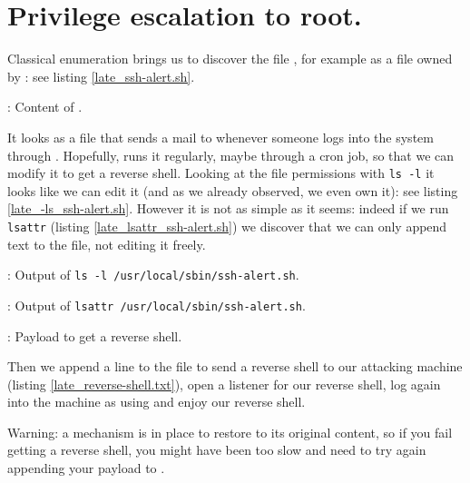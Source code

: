 \section{Privilege escalation to root.}
\par Classical enumeration brings us to discover the file , for example as a file owned by : see listing \ref{late_ssh-alert.sh}.
\begin{listing}
	\caption{: Content of .}
	\label{late_ssh-alert.sh}
\end{listing}
\par It looks as a file that sends a mail to  whenever someone logs into the system through . Hopefully,  runs it regularly, maybe through a cron job, so that we can modify it to get a reverse shell. Looking at the file permissions with \texttt{ls -l} it looks like we can edit it (and as we already observed, we even own it): see listing \ref{late_-ls_ssh-alert.sh}. However it is not as simple as it seems: indeed if we run \texttt{lsattr} (listing \ref{late_lsattr_ssh-alert.sh}) we discover that we can only append text to the file, not editing it freely.
\begin{listing}
	
	\caption{: Output of \texttt{ls -l /usr/local/sbin/ssh-alert.sh}.}
	\label{late_-ls_ssh-alert.sh}
\end{listing}
\begin{listing}
	
	\caption{: Output of \texttt{lsattr /usr/local/sbin/ssh-alert.sh}.}
	\label{late_lsattr_ssh-alert.sh}
\end{listing}
\begin{listing}
	\caption{: Payload to get a reverse shell.}
	\label{late_reverse-shell.txt}
\end{listing}
\par Then we append a line to the file to send a reverse shell to our attacking machine (listing \ref{late_reverse-shell.txt}), open a listener for our reverse shell, log again into the machine as  using  and enjoy our  reverse shell.
\par Warning: a mechanism is in place to restore  to its original content, so if you fail getting a reverse shell, you might have been too slow and need to try again appending your payload to .
